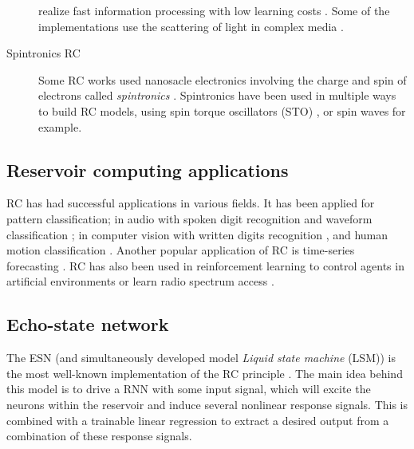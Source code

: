 \begin{description}
        realize fast information processing with low
        learning costs \parencite{paquotOptoelectronicReservoirComputing2012,
        martinenghiPhotonicNonlinearTransient2012,
        suganoReservoirComputingUsing2020, antonikHumanActionRecognition2019}.
        Some of the implementations use the scattering of light in complex media
        \parencite{dongOpticalReservoirComputing2020,
        rafayelyanLargeScaleOpticalReservoir2020}.
  \item[Spintronics \ac{RC}] Some \ac{RC} works used nanosacle electronics
        involving the charge and spin of electrons called \emph{spintronics}
        \parencite{wolfSpintronicsSpinBasedElectronics2001}. Spintronics have
        been used in multiple ways to build \ac{RC} models, using spin torque
        oscillators (STO)
        \parencite{torrejonNeuromorphicComputingNanoscale2017,
        williameChaoticDynamicsMacrospin2019}, or spin waves
        \parencite{nakaneReservoirComputingSpin2018} for example.
\end{description}

\subsection{Reservoir computing applications}

\ac{RC} has had successful applications in various fields. It has been applied
for pattern classification; in audio with spoken digit recognition
\parencite{verstraetenIsolatedWordRecognition2005} and waveform classification
\parencite{paquotOptoelectronicReservoirComputing2012}; in computer vision with
written digits recognition \parencite{jalalvandRealTimeReservoirComputing2015},
and human motion classification \parencite{sohIterativeTemporalLearning2012,
  antonikHumanActionRecognition2019}. Another popular application of \ac{RC} is
time-series forecasting \parencite{jaegerEchoStateApproach2001,
  jaegerAdaptiveNonlinearSystem2002, wyffelsComparativeStudyReservoir2010}.
\ac{RC} has also been used in reinforcement learning to control agents in
artificial environments \parencite{kannoPhotonicReinforcementLearning2022} or
learn radio spectrum access \parencite{changDistributiveDynamicSpectrum2019}.

\subsection{Echo-state network}

The \acf{ESN} (and simultaneously developed model \emph{Liquid state machine}
(LSM)) is the most well-known implementation of the \ac{RC} principle
\parencite{tanakaRecentAdvancesPhysical2019}. The main idea behind this model is
to drive a \ac{RNN} with some input signal, which will excite the neurons within
the reservoir and induce several nonlinear response signals. This is combined
with a trainable linear regression to extract a desired output from a
combination of these response signals.

